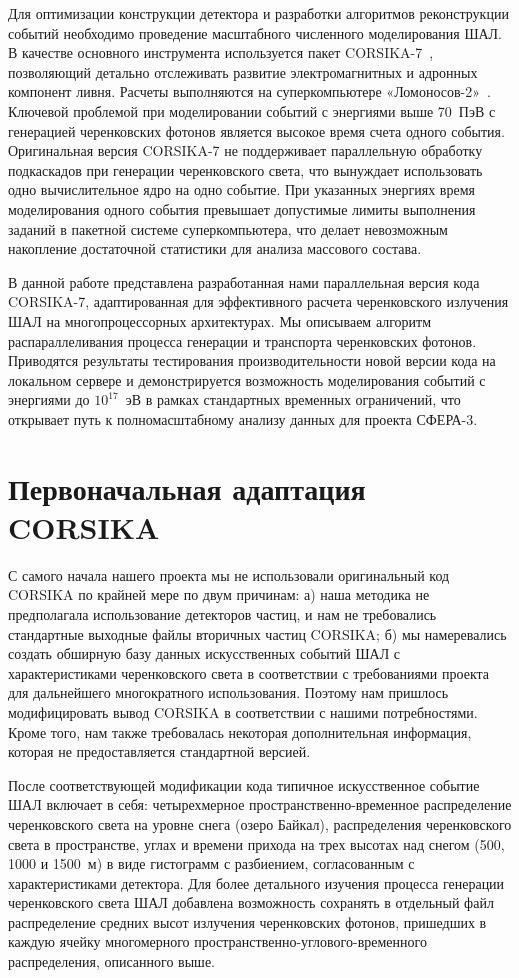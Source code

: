 \documentclass[aps,preprint,showpacs,aps,amsmath,showkeys,nobibnotes,nofootinbib,footnotes,superscriptaddress]{revtex4-2}
\begin{document}
Для оптимизации конструкции детектора и разработки алгоритмов реконструкции событий необходимо проведение масштабного численного моделирования ШАЛ. В качестве основного инструмента используется пакет CORSIKA-7~\cite{CORSIKA-7}, позволяющий детально отслеживать развитие электромагнитных и адронных компонент ливня. Расчеты выполняются на суперкомпьютере «Ломоносов-2»~\cite{SC}. Ключевой проблемой при моделировании событий с энергиями выше 70~ПэВ с генерацией черенковских фотонов является высокое время счета одного события. Оригинальная версия CORSIKA-7 не поддерживает параллельную обработку подкаскадов при генерации черенковского света, что вынуждает использовать одно вычислительное ядро на одно событие. При указанных энергиях время моделирования одного события превышает допустимые лимиты выполнения заданий в пакетной системе суперкомпьютера, что делает невозможным накопление достаточной статистики для анализа массового состава.

В данной работе представлена разработанная нами параллельная версия кода CORSIKA-7, адаптированная для эффективного расчета черенковского излучения ШАЛ на многопроцессорных архитектурах. Мы описываем алгоритм распараллеливания процесса генерации и транспорта черенковских фотонов. Приводятся результаты тестирования производительности новой версии кода на локальном сервере и демонстрируется возможность моделирования событий с энергиями до $10^{17}$~эВ в рамках стандартных временных ограничений, что открывает путь к полномасштабному анализу данных для проекта СФЕРА-3.

\section{Первоначальная адаптация CORSIKA}

С самого начала нашего проекта мы не использовали оригинальный код CORSIKA по крайней мере по двум причинам: а) наша методика не предполагала использование детекторов частиц, и нам не требовались стандартные выходные файлы вторичных частиц CORSIKA; б) мы намеревались создать обширную базу данных искусственных событий ШАЛ с характеристиками черенковского света в соответствии с требованиями проекта для дальнейшего многократного использования. Поэтому нам пришлось модифицировать вывод CORSIKA в соответствии с нашими потребностями. Кроме того, нам также требовалась некоторая дополнительная информация, которая не предоставляется стандартной версией.

После соответствующей модификации кода типичное искусственное событие ШАЛ включает в себя: четырехмерное пространственно-временное распределение черенковского света на уровне снега (озеро Байкал), распределения черенковского света в пространстве, углах и времени прихода на трех высотах над снегом (500, 1000 и 1500~м) в виде гистограмм с разбиением, согласованным с характеристиками детектора. Для более детального изучения процесса генерации черенковского света ШАЛ добавлена возможность сохранять в отдельный файл распределение средних высот излучения черенковских фотонов, пришедших в каждую ячейку многомерного пространственно-углового-временного распределения, описанного выше. 
\end{document}
